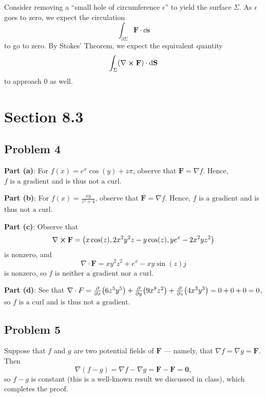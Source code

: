 \documentclass[11pt]{article}
\renewcommand{\vec}[1]{\mathbf{#1}}
\renewcommand{\div}{\nabla \cdot}
\renewcommand{\curl}{\nabla \cross}
\renewcommand{\grad}{\nabla}
\begin{document}
Consider removing a ``small hole of circumference $\epsilon$'' to yield the surface $\Sigma$. As $\epsilon$ goes to zero, we expect the circulation
\[
	\int_{\partial \Sigma} \mathbf{F} \cdot \dd{\vec{s}}
\]
to go to zero. By Stokes' Theorem, we expect the equivalent quantity
\[
	\int_{\Sigma} (\curl \mathbf{F}) \cdot \dd{\vec{S}} 
\]
to approach $0$ as well.


\section{Section 8.3}


\subsection*{Problem 4}

\textbf{Part (a)}: For $f(x) = e^{x} \cos(y) + z \pi$, observe that $\mathbf{F} = \grad f$. Hence, $\boxed{\text{$f$ is a gradient}}$ and is thus $\boxed{\text{not a curl}}$.

\textbf{Part (b)}: For $f(x) = \tfrac{xy}{z^{2} + 4}$, observe that $\mathbf{F} = \grad f$. Hence, $\boxed{\text{$f$ is a gradient}}$ and is thus $\boxed{\text{not a curl}}$.

\textbf{Part (c)}: Observe that
\[
	\curl \mathbf{F} = \left( x \cos(z), 2x^{2}y^{2}z - y \cos(z), ye^{x} - 2x^{2}yz^{2} \right)
\]
is nonzero, and 
\[
	\div \mathbf{F} = xy^{2}z^{2} + e^{x} - xy \sin(z)j
\]
is nonzero, so $\boxed{\text{$f$ is neither a gradient nor a curl}}$.

\textbf{Part (d)}: See that $\div F = \pdv{x} (6z^{5}y^{5}) + \pdv{y} (9x^{8}z^{2}) + \pdv{z} (4x^{3}y^{3}) = 0 + 0 + 0 = 0$, so $\boxed{\text{$f$ is a curl}}$ and is thus $\boxed{\text{not a gradient}}$.


\subsection*{Problem 5}

Suppose that $f$ and $g$ are two potential fields of $\mathbf{F}$ --- namely, that $\grad f = \grad g = \mathbf{F}$. Then
\[
	\grad (f - g) = \grad f - \grad g = \mathbf{F} - \mathbf{F} = \vec{0},
\]
so $f - g$ is constant (this is a well-known result we discussed in class), which completes the proof.
\end{document}
